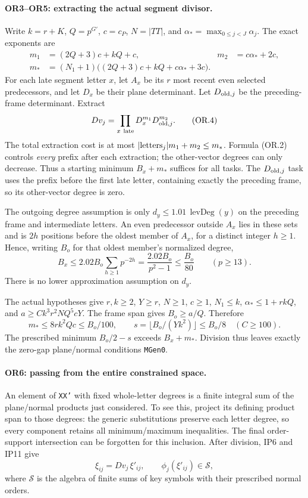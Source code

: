 \paragraph{OR3--OR5: extracting the actual segment divisor.}
Write $k=r+K$, $Q=p^{G'}$, $c=c_P$, $N=|TT|$, and
$\alpha_*=\max_{0\le j<J}\alpha_j$. The exact exponents are
\[
\begin{aligned}
m_1&=(2Q+3)c+kQ+c,&m_2&=c\alpha_*+2c,\\
m_*&=(N_1+1)\bigl((2Q+3)c+kQ+c\alpha_*+3c\bigr).
\end{aligned}                                                   \tag{OR.3}
\]
For each late segment letter $x$, let $A_x$ be its $r$ most recent even
selected predecessors, and let $D_x$ be their plane determinant.
Let $D_{{\rm old},j}$ be the preceding-frame determinant. Extract
\[
                 Dv_j=\prod_{x\ {\rm late}}D_x^{m_1}D_{{\rm old},j}^{m_2}.
                                                               \tag{OR.4}
\]
The total extraction cost is at most $|{\rm letters}_j|m_1+m_2\le m_*$.
Formula (OR.2) controls \emph{every} prefix after each extraction; the
other-vector degrees can only decrease. Thus a starting minimum
$B_x+m_*$ suffices for all tasks. The $D_{{\rm old},j}$ task uses the prefix before
the first late letter, containing exactly the preceding frame, so its
other-vector degree is zero.

The outgoing degree assumption is only $d_y\le1.01\,\operatorname{levDeg}(y)$
on the preceding frame and intermediate letters. An even predecessor
outside $A_x$ lies in these sets and is $2h$ positions before the oldest
member of $A_x$, for a distinct integer $h\ge1$. Hence, writing $B_o$ for
that oldest member's normalized degree,
\[
 B_x\le2.02B_o\sum_{h\ge1}p^{-2h}
       =\frac{2.02B_o}{p^2-1}\le\frac{B_o}{80}
       \qquad(p\ge13).                                    \tag{OR.5}
\]
There is no lower approximation assumption on $d_y$.

The actual hypotheses give $r,k\ge2$, $Y\ge r$, $N\ge1$, $c\ge1$,
$N_1\le k$, $\alpha_*\le1+rkQ$, and
$a\ge Ck^3r^2NQ^5cY$. The frame span gives $B_o\ge a/Q$. Therefore
\[
 m_*\le8rk^2Qc\le B_o/100,\qquad
 s=\lfloor B_o/(Yk^2)\rfloor\le B_o/8
 \quad(C\ge100).
\]
The prescribed minimum $B_o/2-s$ exceeds $B_x+m_*$.
Division thus leaves exactly the zero-gap plane/normal conditions
\texttt{MGen0}.

\paragraph{OR6: passing from the entire constrained space.}
An element of \texttt{XX'} with fixed whole-letter degrees is a finite
integral sum of the plane/normal products just considered. To see this,
project its defining product span to those degrees: the generic
substitutions preserve each letter degree, so every component retains all
minimum/maximum inequalities. The final order-support intersection can
be forgotten for this inclusion. After division, IP6 and IP11 give
\[
 \xi_{ij}=Dv_j\,\xi'_{ij},\qquad
 \phi_j(\xi'_{ij})\in\mathcal S,
\]
where $\mathcal S$ is the algebra of finite sums of key symbols with their
prescribed normal orders.

